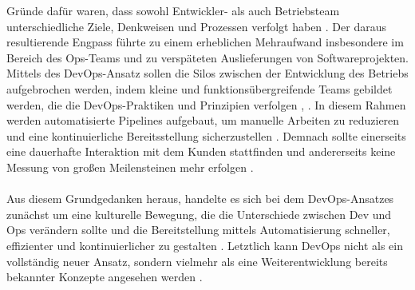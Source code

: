 Gründe dafür waren, dass sowohl Entwickler- als auch Betriebsteam unterschiedliche Ziele, Denkweisen und Prozessen verfolgt haben \cite{wettinger_streamlining_2016}. Der daraus resultierende Engpass führte zu einem erheblichen Mehraufwand insbesondere im Bereich des Ops-Teams und zu verspäteten Auslieferungen von Softwareprojekten. Mittels des DevOps-Ansatz sollen die Silos zwischen der Entwicklung des Betriebs aufgebrochen werden, indem kleine und funktionsübergreifende Teams gebildet werden, die die DevOps-Praktiken und Prinzipien verfolgen \cite{ebert_devops_2016}, \cite{wiedemann_research_2019}. In diesem Rahmen werden automatisierte Pipelines aufgebaut, um manuelle Arbeiten zu reduzieren und eine kontinuierliche Bereitsstellung sicherzustellen \cite[S.3,5]{verona_practical_2016}. Demnach sollte einerseits eine dauerhafte Interaktion mit dem Kunden stattfinden und andererseits keine Messung von großen Meilensteinen mehr erfolgen \cite[S.5]{sharma_devops_2017}.\\\\ Aus diesem Grundgedanken heraus, handelte es sich bei dem DevOps-Ansatzes zunächst um eine kulturelle Bewegung, die die Unterschiede zwischen Dev und Ops verändern sollte und die Bereitstellung mittels Automatisierung schneller, effizienter und kontinuierlicher zu gestalten \cite[S.5]{sharma_devops_2017}. Letztlich kann DevOps nicht als ein vollständig neuer Ansatz, sondern vielmehr als eine Weiterentwicklung bereits bekannter Konzepte angesehen werden \cite[S. 23]{alt_innovationsorientiertes_2017}.

